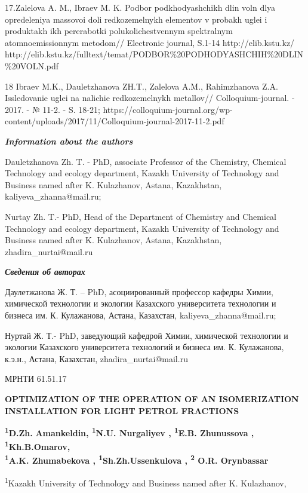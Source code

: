 17.Zalelova A. M., Ibraev M. K. Podbor podkhodyashchikh dlin voln dlya
opredeleniya massovoi doli redkozemel\textquotesingle nykh elementov v
probakh uglei i produktakh ikh pererabotki polukolichestvennym
spektral\textquotesingle nym atomnoemissionnym metodom// Electronic
journal, S.1-14 http://elib.kstu.kz/
http://elib.kstu.kz/fulltext/temat/PODBOR\%20PODHODYASHCHIH\%20DLIN\%20VOLN.pdf

18 Ibraev M.K., Dauletzhanova ZH.T., Zalelova A.M., Rahimzhanova Z.A.
Issledovanie uglei na nalichie redkozemel\textquotesingle nykh
metallov// Colloquium-journal. - 2017. - № 11-2. - S. 18-21;
https://colloquium-journal.org/wp-content/uploads/2017/11/Colloquium-journal-2017-11-2.pdf

\emph{\textbf{Information about the authors}}

Dauletzhanova Zh. T. - PhD, associate Professor of the Chemistry,
Chemical Technology and ecology department, Kazakh University of
Technology and Business named after K. Kulazhanov, Astana, Kazakhstan,
kaliyeva\_zhanna@mail.ru;

Nurtay Zh. T.- PhD, Head of the Department of Chemistry and Chemical
Technology and ecology department, Kazakh University of Technology and
Business named after K. Kulazhanov, Astana, Kazakhstan,
zhadira\_nurtai@mail.ru

\emph{\textbf{Сведения об авторах}}

Даулетжанова Ж. Т. -- PhD, асоциированный профессор кафедры Химии,
химической технологии и экологии Казахского университета технологии и
бизнеса им. К. Кулажанова, Астана, Казахстан, kaliyeva\_zhanna@mail.ru;

Нуртай Ж. Т.- PhD, заведующий кафедрой Химии, химической технологии и
экологии Казахского университета технологий и бизнеса им. К. Кулажанова,
к.э.н., Астана, Казахстан, zhadira\_nurtai@mail.ru

МРНТИ 61.51.17

\textbf{OPTIMIZATION OF THE OPERATION OF AN ISOMERIZATION INSTALLATION
FOR LIGHT PETROL FRACTIONS}

\textbf{\textsuperscript{1}D.Zh.} \textbf{Amankeldin,
\textsuperscript{1}N.U. Nurgaliyev , \textsuperscript{1}E.B. Zhunussova
, \textsuperscript{1}Kh.B.Omarov,\\
\textsuperscript{1}A.K. Zhumabekova ,
\textsuperscript{1}Sh.Zh.Ussenkulova , \textsuperscript{2} O.R.
Orynbassar}

\textsuperscript{1}Kazakh University of Technology and Business named
after K. Kulazhanov,


